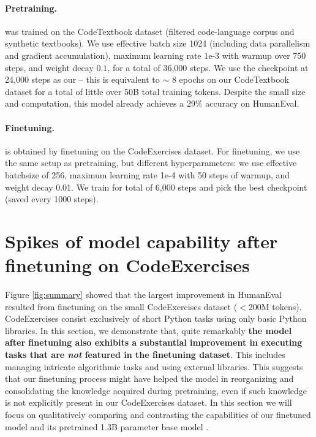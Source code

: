 \paragraph{Pretraining.}\phionebase  was trained on the CodeTextbook dataset (filtered code-language corpus and synthetic textbooks). We use effective batch size  1024 (including data parallelism and gradient accumulation), maximum learning rate 1e-3 with warmup over 750 steps, and weight decay  $0.1$, for a total of 36,000 steps. We use the checkpoint at 24,000 steps as our \phionebase --  this is equivalent to $\sim$ 8 epochs on our CodeTextbook dataset for a total of little over 50B total training tokens. Despite the small size and computation, this model already achieves a 29\% accuracy on HumanEval. 

\paragraph{Finetuning.} \phione is obtained by finetuning \phionebase on the CodeExercises dataset. For finetuning, we use the same setup as pretraining, but different hyperparameters: we use effective batchsize of 256, maximum learning rate 1e-4 with 50 steps of warmup, and weight decay 0.01. We train for total of 6,000 steps and pick the best checkpoint (saved every 1000 steps). 

\section{Spikes of model capability after finetuning on CodeExercises} \label{sec:sparks}

Figure \ref{fig:summary} showed that the largest improvement in HumanEval resulted from finetuning on the small CodeExercises dataset ($<$200M tokens).  CodeExercises consist exclusively of short Python tasks using only basic Python libraries. In this section, we demonstrate that, quite remarkably \textbf{the model after finetuning also exhibits a substantial improvement in executing tasks that are \textit{not} featured in the finetuning dataset}. This includes managing intricate algorithmic tasks and using external libraries. 
This suggests that our finetuning process might have helped the model in reorganizing and consolidating the knowledge acquired during pretraining, even if such knowledge is not explicitly present in our CodeExercises dataset. In this section we will focus on qualitatively comparing and contrasting the capabilities of our finetuned model \phione and its pretrained 1.3B parameter base model \phionebase\!\!. %

